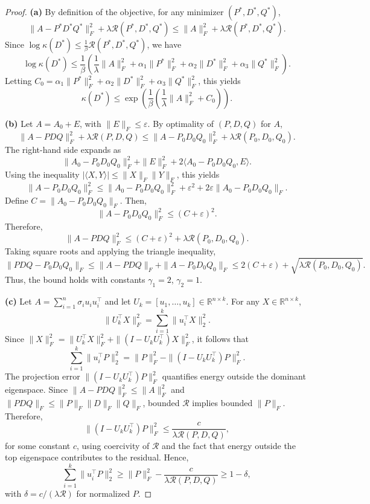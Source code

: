 \documentclass[10pt,a4paper]{amsart}
\begin{document}
\begin{proof}
\textbf{(a)} By definition of the objective, for any minimizer \( (P^*, D^*, Q^*) \),
\[
\|A - P^* D^* Q^*\|_F^2 + \lambda \mathcal{R}(P^*, D^*, Q^*) \leq \|A\|_F^2 + \lambda \mathcal{R}(P^*, D^*, Q^*).
\]
Since \( \log \kappa(D^*) \leq \frac{1}{\beta} \mathcal{R}(P^*, D^*, Q^*) \), we have
\[
\log \kappa(D^*) \leq \frac{1}{\beta} \left( \frac{1}{\lambda} \|A\|_F^2 + \alpha_1 \|P^*\|_F^2 + \alpha_2 \|D^*\|_F^2 + \alpha_3 \|Q^*\|_F^2 \right).
\]
Letting \( C_0 = \alpha_1 \|P^*\|_F^2 + \alpha_2 \|D^*\|_F^2 + \alpha_3 \|Q^*\|_F^2 \), this yields
\[
\kappa(D^*) \leq \exp\left( \frac{1}{\beta} \left( \frac{1}{\lambda} \|A\|_F^2 + C_0 \right) \right).
\]

\textbf{(b)} Let \( A = A_0 + E \), with \( \|E\|_F \leq \varepsilon \). By optimality of \( (P, D, Q) \) for \( A \),
\[
\|A - P D Q\|_F^2 + \lambda \mathcal{R}(P, D, Q) \leq \|A - P_0 D_0 Q_0\|_F^2 + \lambda \mathcal{R}(P_0, D_0, Q_0).
\]
The right-hand side expands as
\[
\|A_0 - P_0 D_0 Q_0\|_F^2 + \|E\|_F^2 + 2\langle A_0 - P_0 D_0 Q_0, E \rangle.
\]
Using the inequality \( |\langle X, Y \rangle| \leq \|X\|_F \|Y\|_F \), this yields
\[
\|A - P_0 D_0 Q_0\|_F^2 \leq \|A_0 - P_0 D_0 Q_0\|_F^2 + \varepsilon^2 + 2 \varepsilon \|A_0 - P_0 D_0 Q_0\|_F.
\]
Define \( C = \|A_0 - P_0 D_0 Q_0\|_F \). Then,
\[
\|A - P_0 D_0 Q_0\|_F^2 \leq (C + \varepsilon)^2.
\]
Therefore,
\[
\|A - P D Q\|_F^2 \leq (C + \varepsilon)^2 + \lambda \mathcal{R}(P_0, D_0, Q_0).
\]
Taking square roots and applying the triangle inequality,
\[
\|P D Q - P_0 D_0 Q_0\|_F \leq \|A - P D Q\|_F + \|A - P_0 D_0 Q_0\|_F \leq 2(C + \varepsilon) + \sqrt{\lambda \mathcal{R}(P_0, D_0, Q_0)}.
\]
Thus, the bound holds with constants \( \gamma_1 = 2 \), \( \gamma_2 = 1 \).

\textbf{(c)} Let \( A = \sum_{i=1}^n \sigma_i u_i u_i^\top \) and let \( U_k = [u_1, \dots, u_k] \in \mathbb{R}^{n \times k} \). For any \( X \in \mathbb{R}^{n \times k} \),
\[
\|U_k^\top X\|_F^2 = \sum_{i=1}^k \|u_i^\top X\|_2^2.
\]
Since \( \|X\|_F^2 = \|U_k^\top X\|_F^2 + \|(I - U_k U_k^\top) X\|_F^2 \), it follows that
\[
\sum_{i=1}^k \|u_i^\top P\|_2^2 = \|P\|_F^2 - \|(I - U_k U_k^\top) P\|_F^2.
\]
The projection error \( \|(I - U_k U_k^\top) P\|_F^2 \) quantifies energy outside the dominant eigenspace. Since \( \|A - P D Q\|_F^2 \leq \|A\|_F^2 \) and \( \|P D Q\|_F \leq \|P\|_F \|D\|_F \|Q\|_F \), bounded \( \mathcal{R} \) implies bounded \( \|P\|_F \). Therefore,
\[
\|(I - U_k U_k^\top) P\|_F^2 \leq \frac{c}{\lambda \mathcal{R}(P, D, Q)},
\]
for some constant \( c \), using coercivity of \( \mathcal{R} \) and the fact that energy outside the top eigenspace contributes to the residual. Hence,
\[
\sum_{i=1}^k \|u_i^\top P\|_2^2 \geq \|P\|_F^2 - \frac{c}{\lambda \mathcal{R}(P, D, Q)} \geq 1 - \delta,
\]
with \( \delta = c / (\lambda \mathcal{R}) \) for normalized \( P \).
\end{proof}
\end{document}
